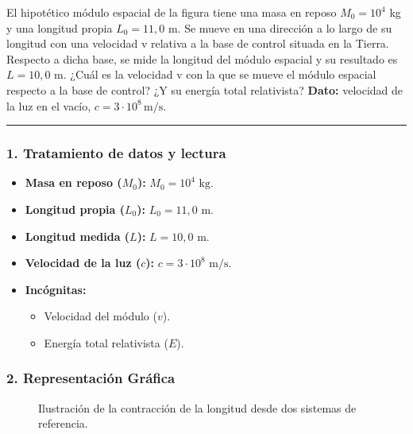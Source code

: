 \begin{cajaenunciado}
El hipotético módulo espacial de la figura tiene una masa en reposo $M_0=10^4$ kg y una longitud propia $L_0=11,0$ m. Se mueve en una dirección a lo largo de su longitud con una velocidad v relativa a la base de control situada en la Tierra. Respecto a dicha base, se mide la longitud del módulo espacial y su resultado es $L=10,0$ m. ¿Cuál es la velocidad v con la que se mueve el módulo espacial respecto a la base de control? ¿Y su energía total relativista?
\textbf{Dato:} velocidad de la luz en el vacío, $c=3\cdot10^{8}\,\text{m/s}$.
\end{cajaenunciado}
\hrule

\subsubsection*{1. Tratamiento de datos y lectura}
\begin{itemize}
    \item \textbf{Masa en reposo ($M_0$):} $M_0 = 10^4 \text{ kg}$.
    \item \textbf{Longitud propia ($L_0$):} $L_0 = 11,0 \text{ m}$.
    \item \textbf{Longitud medida ($L$):} $L = 10,0 \text{ m}$.
    \item \textbf{Velocidad de la luz ($c$):} $c = 3 \cdot 10^8 \text{ m/s}$.
    \item \textbf{Incógnitas:}
    \begin{itemize}
        \item Velocidad del módulo ($v$).
        \item Energía total relativista ($E$).
    \end{itemize}
\end{itemize}

\subsubsection*{2. Representación Gráfica}
\begin{figure}[H]
    \centering
    \caption{Ilustración de la contracción de la longitud desde dos sistemas de referencia.}
\end{figure}

